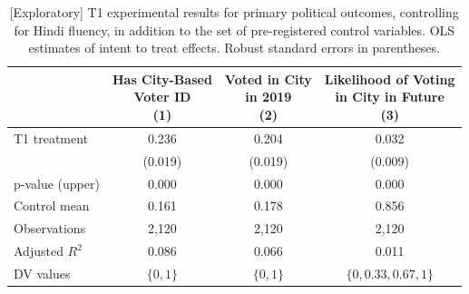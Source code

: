 \documentclass[
  11.5pt,
]{article}
\begin{document}
\begin{table}[!h]

\caption{\label{tab:unnamed-chunk-58}[Exploratory] T1 experimental results for primary political outcomes, controlling for Hindi fluency, in addition to the set of pre-registered control variables. OLS estimates of intent to treat effects. Robust standard errors in parentheses.}
\centering
\begin{tabular}[t]{lccc}
\toprule
 & \makecell[c]{Has City-Based\\ Voter ID \\(1)} & \makecell[c]{Voted in City\\ in 2019 \\(2)} & \makecell[c]{Likelihood of Voting\\ in City in Future \\(3)}\\
\midrule
T1 treatment & 0.236 & 0.204 & 0.032\\
 & (0.019) & (0.019) & (0.009)\\
\midrule
p-value (upper) & 0.000 & 0.000 & 0.000\\
Control mean & 0.161 & 0.178 & 0.856\\
Observations & 2,120 & 2,120 & 2,120\\
Adjusted $R^2$ & 0.086 & 0.066 & 0.011\\
DV values & $\{0, 1\}$ & $\{0, 1\}$ & $\{0, 0.33, 0.67, 1\}$\\
\bottomrule
\end{tabular}
\end{table}
\end{document}
